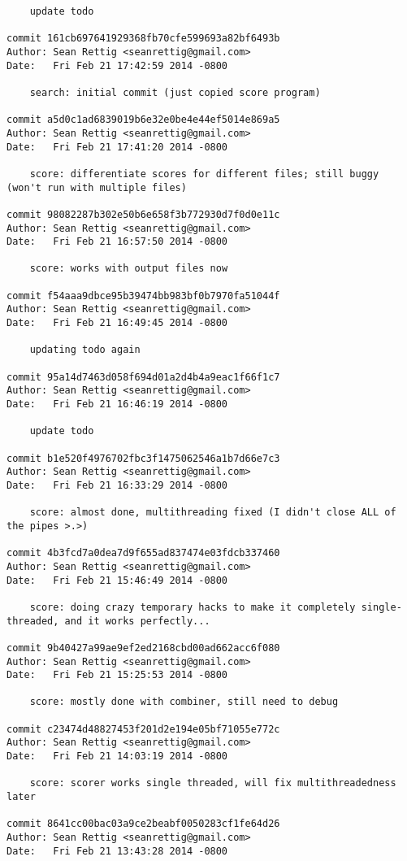 \documentclass[letterpaper,10pt,fleqn]{article}
\numberwithin{equation}{section}
\begin{document}
\begin{verbatim}
    update todo

commit 161cb697641929368fb70cfe599693a82bf6493b
Author: Sean Rettig <seanrettig@gmail.com>
Date:   Fri Feb 21 17:42:59 2014 -0800

    search: initial commit (just copied score program)

commit a5d0c1ad6839019b6e32e0be4e44ef5014e869a5
Author: Sean Rettig <seanrettig@gmail.com>
Date:   Fri Feb 21 17:41:20 2014 -0800

    score: differentiate scores for different files; still buggy (won't run with multiple files)

commit 98082287b302e50b6e658f3b772930d7f0d0e11c
Author: Sean Rettig <seanrettig@gmail.com>
Date:   Fri Feb 21 16:57:50 2014 -0800

    score: works with output files now

commit f54aaa9dbce95b39474bb983bf0b7970fa51044f
Author: Sean Rettig <seanrettig@gmail.com>
Date:   Fri Feb 21 16:49:45 2014 -0800

    updating todo again

commit 95a14d7463d058f694d01a2d4b4a9eac1f66f1c7
Author: Sean Rettig <seanrettig@gmail.com>
Date:   Fri Feb 21 16:46:19 2014 -0800

    update todo

commit b1e520f4976702fbc3f1475062546a1b7d66e7c3
Author: Sean Rettig <seanrettig@gmail.com>
Date:   Fri Feb 21 16:33:29 2014 -0800

    score: almost done, multithreading fixed (I didn't close ALL of the pipes >.>)

commit 4b3fcd7a0dea7d9f655ad837474e03fdcb337460
Author: Sean Rettig <seanrettig@gmail.com>
Date:   Fri Feb 21 15:46:49 2014 -0800

    score: doing crazy temporary hacks to make it completely single-threaded, and it works perfectly...

commit 9b40427a99ae9ef2ed2168cbd00ad662acc6f080
Author: Sean Rettig <seanrettig@gmail.com>
Date:   Fri Feb 21 15:25:53 2014 -0800

    score: mostly done with combiner, still need to debug

commit c23474d48827453f201d2e194e05bf71055e772c
Author: Sean Rettig <seanrettig@gmail.com>
Date:   Fri Feb 21 14:03:19 2014 -0800

    score: scorer works single threaded, will fix multithreadedness later

commit 8641cc00bac03a9ce2beabf0050283cf1fe64d26
Author: Sean Rettig <seanrettig@gmail.com>
Date:   Fri Feb 21 13:43:28 2014 -0800


\end{verbatim}
\end{document}

